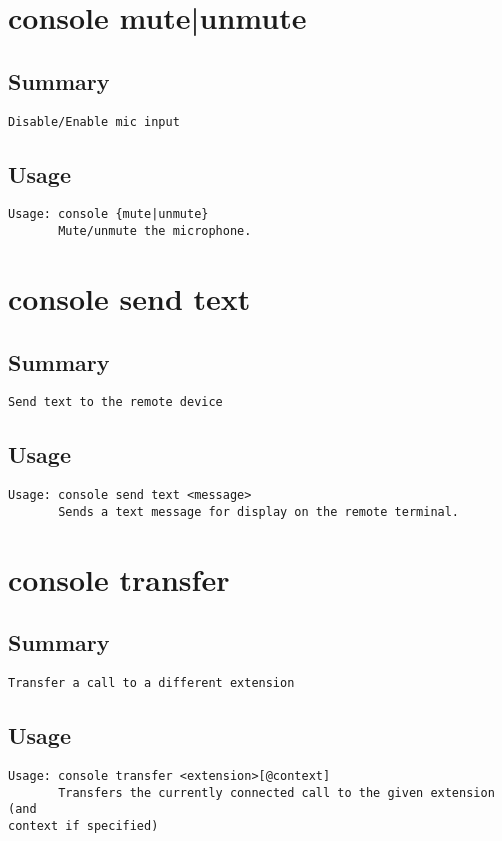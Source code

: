 \section{console {mute|unmute}}
\subsection{Summary}
\begin{verbatim}
Disable/Enable mic input
\end{verbatim}
\subsection{Usage}
\begin{verbatim}
Usage: console {mute|unmute}
       Mute/unmute the microphone.

\end{verbatim}


\section{console send text}
\subsection{Summary}
\begin{verbatim}
Send text to the remote device
\end{verbatim}
\subsection{Usage}
\begin{verbatim}
Usage: console send text <message>
       Sends a text message for display on the remote terminal.

\end{verbatim}


\section{console transfer}
\subsection{Summary}
\begin{verbatim}
Transfer a call to a different extension
\end{verbatim}
\subsection{Usage}
\begin{verbatim}
Usage: console transfer <extension>[@context]
       Transfers the currently connected call to the given extension (and
context if specified)

\end{verbatim}


